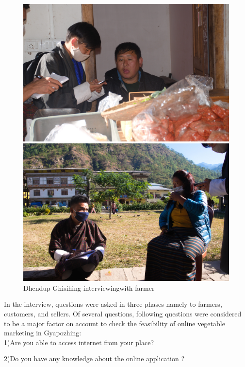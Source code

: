 \documentclass[12pt]{report}
\begin{document}
\begin{normalsize}
\begin{figure}[!htb]
\begin{minipage}{0.48\textwidth}
     \caption{Dawa Tshring and Dhendup Ghishinginterviewing with seller}\label{Fig:Data2}
   \end{minipage}
   \begin{minipage}{0.48\textwidth}
     \centering
     \includegraphics[width=.7\linewidth]{3-min.jpg}
     \caption{Dawa Tshring interviewing\newline with Seller}\label{Fig:Data2}
   \end{minipage}
   \begin{minipage}{0.48\textwidth}
     \centering
     \includegraphics[width=.7\linewidth]{4-min.jpg}
     \caption{Dhendup Ghisihing interviewing\newline with farmer}\label{Fig:Data2}
   \end{minipage}
\end{figure}
In the interview, questions were asked in three phases namely to farmers, customers, and sellers. Of several questions, following questions were considered to be a major factor on account to check the feasibility of online vegetable marketing in Gyapozhing: \newline\\[0.1cm]

1)Are you able to access internet from your place?

2)Do you have any knowledge about the online application ?


\end{normalsize}
\end{document}

